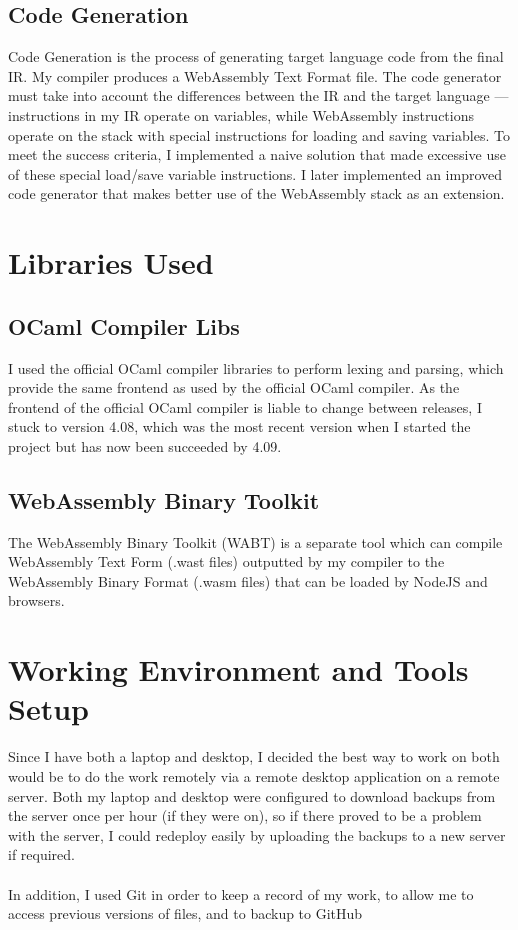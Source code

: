 \subsection{Code Generation}
Code Generation is the process of generating target language code from the final IR. My compiler produces a WebAssembly Text Format file. The code generator must take into account the differences between the IR and the target language --- instructions in my IR operate on variables, while WebAssembly instructions operate on the stack with special instructions for loading and saving variables. To meet the success criteria, I implemented a naive solution that made excessive use of these special load/save variable instructions. I later implemented an improved code generator that makes better use of the WebAssembly stack as an extension.

\section{Libraries Used}
\subsection{OCaml Compiler Libs}
I used the official OCaml compiler \cite{OCaml} libraries to perform lexing and parsing, which provide the same frontend as used by the official OCaml compiler. As the frontend of the official OCaml compiler is liable to change between releases, I stuck to version 4.08, which was the most recent version when I started the project but has now been succeeded by 4.09.

\subsection{WebAssembly Binary Toolkit}
The WebAssembly Binary Toolkit \cite{Wabt} (WABT)  is a separate tool which can compile WebAssembly Text Form (.wast files) outputted by my compiler to the WebAssembly Binary Format (.wasm files) that can be loaded by NodeJS and browsers.


\section{Working Environment and Tools Setup}
Since I have both a laptop and desktop, I decided the best way to work on both would be to do the work remotely via a remote desktop application on a remote server. Both my laptop and desktop were configured to download backups from the server once per hour (if they were on), so if there proved to be a problem with the server, I could redeploy easily by uploading the backups to a new server if required.
\\\\
In addition, I used Git in order to keep a record of my work, to allow me to access previous versions of files, and to backup to GitHub

